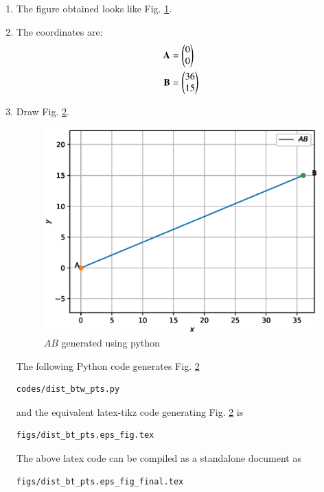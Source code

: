 \renewcommand{\theequation}{\theenumi}
\begin{enumerate}[label=\thesection.\arabic*.,ref=\thesection.\theenumi]

\begin{figure}[!ht]
\centering
\resizebox{\columnwidth}{!}{}
\caption{$AB$ by Latex-Tikz}
\label{fig:dist_btw_pts}	
\end{figure}

\item The figure obtained looks like Fig. \ref{fig:dist_btw_pts}.\\ 

\item The coordinates are: \\
\begin{align}
\mathbf{A} &=\begin{pmatrix}0\\0\end{pmatrix} \label{eq:constr_a}\\
\mathbf{B} &=\begin{pmatrix}36\\15\end{pmatrix} \label{eq:constr_b}
\end{align}

\item Draw Fig. \ref{fig:dist_btw_pts2}.

\begin{figure}[!ht]
\centering
\includegraphics[width=\columnwidth]{./figs/dist_bt_pts.eps}
\caption{$AB$ generated using python}
\label{fig:dist_btw_pts2}
\end{figure} 

\solution The  following Python code generates Fig. \ref{fig:dist_btw_pts2}

\begin{lstlisting}
codes/dist_btw_pts.py
\end{lstlisting}

and the equivalent latex-tikz code generating Fig. \ref{fig:dist_btw_pts2} is 
\begin{lstlisting}
figs/dist_bt_pts.eps_fig.tex
\end{lstlisting}
%
The above latex code can be compiled as a standalone document as
\begin{lstlisting}
figs/dist_bt_pts.eps_fig_final.tex
\end{lstlisting}
\end{enumerate}

